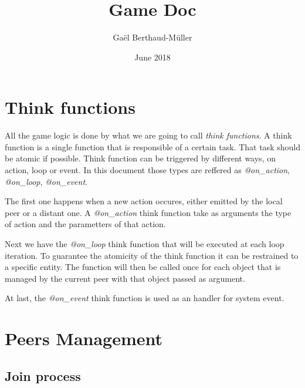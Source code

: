 \documentclass{article}
\title{Game Doc}
\author{Gaël Berthaud-Müller}
\date{June 2018}
\begin{document}
\maketitle
\tableofcontents
\newpage
\section{Think functions}

All the game logic is done by what we are going to call \textit{think functions}. A think function is a single function that is responsible of a certain task. That task should be atomic if possible.
Think function can be triggered by different ways, on action, loop or event. In this document those types are reffered as \textit{@on\_action}, \textit{@on\_loop}, \textit{@on\_event}.

The first one happens when a new action occures, either emitted by the local peer or a distant one. A \textit{@on\_action} think function take as arguments the type of action and the parametters of that action.

Next we have the \textit{@on\_loop} think function that will be executed at each loop iteration. To guarantee the atomicity of the think function it can be restrained to a specific entity. The function will then be called once for each object that is managed by the current peer with that object passed as argument.

At last, the \textit{@on\_event} think function is used as an handler for system event.
\section{Peers Management}
\subsection{Join process}
\end{document}
